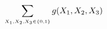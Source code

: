 \documentclass[preview]{standalone}
\begin{document}
\begin{align*}
\special{dvisvgm:raw <g id='unique000'>}\sum_{\scriptscriptstyle X_1, X_2, X_3 \in \{0,1\}} g(X_1, X_2, X_3)\special{dvisvgm:raw </g>}
\end{align*}
\end{document}
